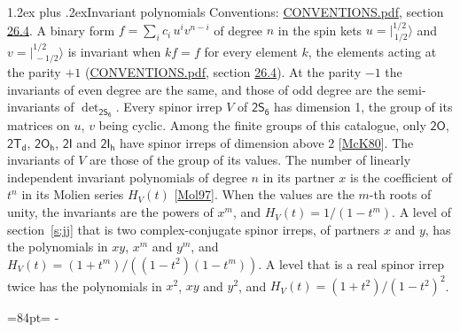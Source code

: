 \documentclass[10pt,a4paper]{article}
\makeatletter
\renewcommand\section{\@startsection{section}{1}{\z@}{-3ex plus -1ex minus -.2ex}%
  {1.2ex plus .2ex}{\normalfont\large\sffamily\bfseries\color{parttitle}}}
\newcommand{\needspace}[1]{\par\penalty-100\begingroup\dimen0=#1\relax\dimen2=\pagegoal
  \advance\dimen2-\pagetotal\ifdim\dimen0>\dimen2\relax\ifdim\dimen2>0pt\vfil\break\fi\fi
  \endgroup}
\numberwithin{equation}{section}
\newcommand{\grp}[1]{\mathsf{#1}}
\newcommand{\jm}[2]{\bigl\lvert{}^{#1}_{\,#2}\bigr\rangle}
\makeatother
\begin{document}
\section{Invariant polynomials}\label{s:invariants}
Conventions: \href{../../CONVENTIONS.pdf}{CONVENTIONS.pdf}, section \href{../../CONVENTIONS.pdf\#conv.26.4}{26.4}.
\leavevmode\label{n:local.binary.form}A binary form $f = \sum_i c_i\, u^i v^{n-i}$ of degree $n$ in the spin kets $u = \jm{1/2}{1/2}$ and $v = \jm{1/2}{-1/2}$ is invariant when $k f = f$ for every element $k$, the elements acting at the parity $+1$ (\href{../../CONVENTIONS.pdf}{CONVENTIONS.pdf}, section \href{../../CONVENTIONS.pdf\#conv.26.4}{26.4}). At the parity $-1$ the invariants of even degree are the same, and those of odd degree are the semi-invariants of $\det_{\grp{2S_{6}}}$.
\leavevmode\label{n:function.hilbert}Every spinor irrep $V$ of $\grp{2S_{6}}$ has dimension 1, the group of its matrices on $u$, $v$ being cyclic. Among the finite groups of this catalogue, only $\grp{2O}$, $\grp{2T_{d}}$, $\grp{2O_{h}}$, $\grp{2I}$ and $\grp{2I_{h}}$ have spinor irreps of dimension above 2 [\href{../../../REFERENCES.pdf\#ref.McK80}{McK80}]. The invariants of $V$ are those of the group of its values. \label{n:local.partner.x}The number of linearly independent invariant polynomials of degree $n$ in its partner $x$ is the coefficient of $t^n$ in its Molien series $H_V(t)$ [\href{../../../REFERENCES.pdf\#ref.Mol97}{Mol97}]. When the values are the $m$-th roots of unity, the invariants are the powers of $x^{m}$, and $H_V(t) = 1/(1 - t^{m})$. A level of section~\ref{s:jj} that is two complex-conjugate spinor irreps, of partners $x$ and $y$, has the polynomials in $xy$, $x^{m}$ and $y^{m}$, and $H_V(t) = (1 + t^{m})/((1 - t^{2})(1 - t^{m}))$. A level that is a real spinor irrep twice has the polynomials in $x^{2}$, $xy$ and $y^{2}$, and $H_V(t) = (1 + t^{2})/(1 - t^{2})^{2}$.
\needspace{84pt}
\end{document}
